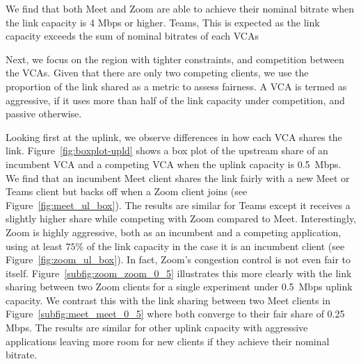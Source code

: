 We find that both Meet and Zoom are able to achieve their nominal bitrate when the link capacity is 4 Mbps or higher. Teams,  This is expected as the link capacity exceeds the sum of nominal bitrates of each VCAs

Next, we focus on the region with tighter constraints, and competition between the VCAs. Given that there are only two competing clients, we use the proportion of the link shared as a metric to assess fairness. A VCA is termed as aggressive, if it uses more than half of the link capacity under competition, and passive otherwise. 

Looking first at the uplink, we observe differences in how each VCA shares the link. Figure~\ref{fig:boxplot-upld} shows a box plot of the upstream share of an incumbent VCA and a competing VCA when the uplink capacity is 0.5~Mbps.  We find that an incumbent Meet client shares the link fairly with a new Meet or Teams client but backs off when a Zoom client joins (see Figure~\ref{fig:meet_ul_box}). The results are similar for Teams except it receives a slightly higher share while competing with Zoom compared to Meet. Interestingly, Zoom is highly aggressive, both as an incumbent and a competing application, using at least $75\%$ of the link capacity in the case it is an incumbent client (see Figure~\ref{fig:zoom_ul_box}). In fact, Zoom's congestion control is not even fair to itself. Figure~\ref{subfig:zoom_zoom_0_5} illustrates this more clearly with the link sharing between two Zoom clients for a single experiment under 0.5~Mbps uplink capacity. We contrast this with the link sharing between two Meet clients in Figure~\ref{subfig:meet_meet_0_5} where both converge to their fair share of 0.25 Mbps. The results are similar for other uplink capacity with aggressive applications leaving more room for new clients if they achieve their nominal bitrate.  %

